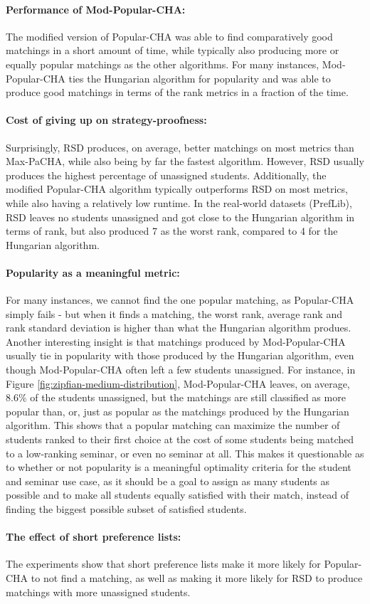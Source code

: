 \paragraph{Performance of Mod-Popular-CHA:} The modified version of Popular-CHA was able to find comparatively good matchings in a short amount of time, while typically also producing more or equally popular matchings as the other algorithms. For many instances, Mod-Popular-CHA ties the Hungarian algorithm for popularity and was able to produce good matchings in terms of the rank metrics in a fraction of the time.
\paragraph{Cost of giving up on strategy-proofness:} Surprisingly, RSD produces, on average, better matchings on most metrics than Max-PaCHA, while also being by far the fastest algorithm. However, RSD usually produces the highest percentage of unassigned students. Additionally, the modified Popular-CHA algorithm typically outperforms RSD on most metrics, while also having a relatively low runtime. In the real-world datasets (PrefLib), RSD leaves no students unassigned and got close to the Hungarian algorithm in terms of rank, but also produced 7 as the worst rank, compared to 4 for the Hungarian algorithm. 
\paragraph{Popularity as a meaningful metric:} For many instances, we cannot find the one popular matching, as Popular-CHA simply fails - but when it finds a matching, the worst rank, average rank and rank standard deviation is higher than what the Hungarian algorithm produes. Another interesting insight is that matchings produced by Mod-Popular-CHA usually tie in popularity with those produced by the Hungarian algorithm, even though Mod-Popular-CHA often left a few students unassigned. For instance, in Figure \ref{fig:zipfian-medium-distribution}, Mod-Popular-CHA leaves, on average, 8.6\% of the students unassigned, but the matchings are still classified as more popular than, or, just as popular as the matchings produced by the Hungarian algorithm. This shows that a popular matching can maximize the number of students ranked to their first choice at the cost of some students being matched to a low-ranking seminar, or even no seminar at all. This makes it questionable as to whether or not popularity is a meaningful optimality criteria for the student and seminar use case, as it should be a goal to assign as many students as possible and to make all students equally satisfied with their match, instead of finding the biggest possible subset of satisfied students.
\paragraph{The effect of short preference lists:} The experiments show that short preference lists make it more likely for Popular-CHA to not find a matching, as well as making it more likely for RSD to produce matchings with more unassigned students.
